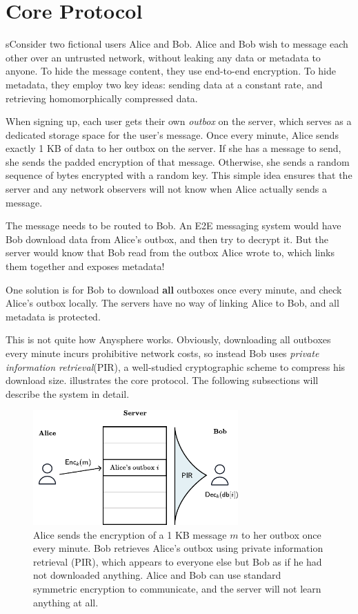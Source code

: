 \section{Core Protocol}
\label{sec:coreprotocol}

sConsider two fictional users Alice and Bob. Alice and Bob wish to message each other over an untrusted network, without leaking any data or metadata to anyone. To hide the message content, they use end-to-end encryption. To hide metadata, they employ two key ideas: sending data at a constant rate, and retrieving homomorphically compressed data.

When signing up, each user gets their own \textit{outbox} on the server, which serves as a dedicated storage space for the user's message. Once every minute, Alice sends exactly 1 KB of data to her outbox on the server. If she has a message to send, she sends the padded encryption of that message. Otherwise, she sends a random sequence of bytes encrypted with a random key. This simple idea ensures that the server and any network observers will not know when Alice actually sends a message.

The message needs to be routed to Bob. An E2E messaging system would have Bob download data from Alice's outbox, and then try to decrypt it. But the server would know that Bob read from the outbox Alice wrote to, which links them together and exposes metadata!

One solution is for Bob to download \textbf{all} outboxes once every minute, and check Alice's outbox locally. The servers have no way of linking Alice to Bob, and all metadata is protected.

This is not quite how Anysphere works. Obviously, downloading all outboxes every minute incurs prohibitive network costs, so instead Bob uses \textit{private information retrieval}(PIR), a well-studied cryptographic scheme to compress his download size.  illustrates the core protocol. The following subsections will describe the system in detail.

\begin{figure}
    \centering
    \includegraphics[width=0.7\textwidth]{pirfigure.pdf}
\caption{Alice sends the encryption of a 1 KB message $m$ to her outbox once every minute. Bob retrieves Alice's outbox using private information retrieval (PIR), which appears to everyone else but Bob as if he had not downloaded anything. Alice and Bob can use standard symmetric encryption to communicate, and the server will not learn anything at all.}
\label{fig:highlevelpir}
\end{figure}




